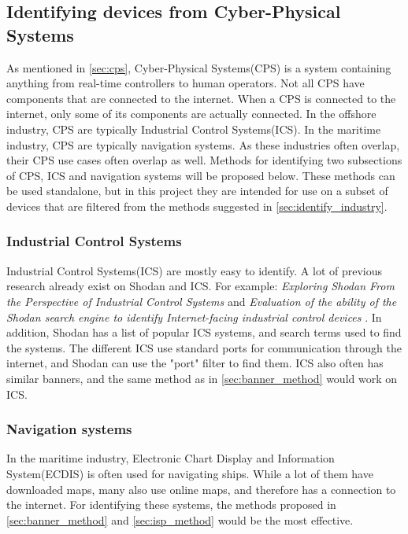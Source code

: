 \subsection{Identifying devices from Cyber-Physical Systems} \label{sec:identify_cps}
As mentioned in \cref{sec:cps}, Cyber-Physical Systems(CPS) is a system containing anything from real-time controllers to human operators. Not all CPS have components that are connected to the internet. When a CPS is connected to the internet, only some of its components are actually connected. In the offshore industry, CPS are typically Industrial Control Systems(ICS). In the maritime industry, CPS are typically navigation systems. As these industries often overlap, their CPS use cases often overlap as well. Methods for identifying two subsections of CPS, ICS and navigation systems will be proposed below.
These methods can be used standalone, but in this project they are intended for use on a subset of devices that are filtered from the methods suggested in \cref{sec:identify_industry}.

\subsubsection{Industrial Control Systems}
Industrial Control Systems(ICS) are mostly easy to identify. A lot of previous research already exist on Shodan and ICS. For example: \textit{Exploring Shodan From the Perspective of Industrial Control Systems}\cite{bodenheim_butts_dunlap_mullins_2014} and \textit{Evaluation of the ability of the Shodan search engine to identify Internet-facing industrial control devices} \cite{ICS_shodan_article}.  In addition, Shodan has a list of popular ICS systems, and search terms used to find the systems.\cite{shodan_ics} The different ICS use standard ports for communication through the internet, and Shodan can use the "port" filter to find them. ICS also often has similar banners, and the same method as in \cref{sec:banner_method} would work on ICS.

\subsubsection{Navigation systems}
In the maritime industry, Electronic Chart Display and Information System(ECDIS) is often used for navigating ships. While a lot of them have downloaded maps, many also use online maps, and therefore has a connection to the internet. For identifying these systems, the methods proposed in \cref{sec:banner_method} and \cref{sec:isp_method} would be the most effective.

\newpage
